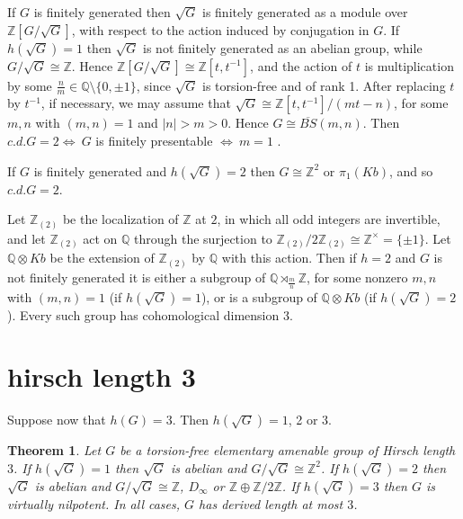 \documentclass[12pt]{amsart}
\newtheorem{theorem}{Theorem}
\begin{document}
If $G$ is finitely generated then $\sqrt{G}$ is finitely generated as a module over
$\mathbb{Z}[G/\sqrt{G}]$, with respect to the action induced by conjugation in $G$.
If $h(\sqrt{G})=1$ then $\sqrt{G}$ is not finitely generated as an abelian group, 
while $G/\sqrt{G}\cong\mathbb{Z}$.
Hence  $\mathbb{Z}[G/\sqrt{G}]\cong\mathbb{Z}[t,t^{-1}]$,
and the action of $t$ is multiplication by some 
$\frac{n}m\in\mathbb{Q}\setminus\{0,\pm1\}$,
since $\sqrt{G}$ is torsion-free and of rank 1.
After replacing $t$ by $t^{-1}$, if necessary, 
we may assume that $\sqrt{G}\cong\mathbb{Z}[t,t^{-1}]/(mt-n)$, 
for some $m,n$ with $(m,n)=1$ and $|n|>m>0$.
Hence $G\cong\overline{BS}(m,n)$.
Then $c.d.G=2\Leftrightarrow~G$ is finitely presentable 
$\Leftrightarrow~{m}=1$ \cite{Gi79}.

If $G$ is finitely generated and $h(\sqrt{G})=2$ then $G\cong\mathbb{Z}^2$ or
$\pi_1(Kb)$, and so $c.d.G=2$.

Let $\mathbb{Z}_{(2)}$ be the localization of $\mathbb{Z}$ at $2$, 
in which all odd integers are invertible, and let $\mathbb{Z}_{(2)}$ act 
on $\mathbb{Q}$ through the surjection to 
$\mathbb{Z}_{(2)}/2\mathbb{Z}_{(2)}\cong\mathbb{Z}^\times=\{\pm1\}$.
Let  $\mathbb{Q}\otimes{Kb}$ be the extension of $\mathbb{Z}_{(2)}$ by 
$\mathbb{Q}$ with this action.
Then if $h=2$ and $G$ is not finitely generated it is either a subgroup of 
$\mathbb{Q}\rtimes_{\frac{m}n}\mathbb{Z}$,
for some nonzero $m,n$ with $(m,n)=1$  (if $h(\sqrt{G})=1$),
or is a subgroup of 
$\mathbb{Q}\otimes{Kb}$ (if $h(\sqrt{G})=2$).
Every such group has cohomological dimension 3.

\section{hirsch length 3}

Suppose now that $h(G)=3$. Then $h(\sqrt{G})=1$,  2 or 3.

\begin{theorem}
\label{h=3}
Let $G$ be a torsion-free elementary amenable group of Hirsch length $3$.
If $h(\sqrt{G})=1$ then $\sqrt{G}$ is abelian and $G/\sqrt{G}\cong\mathbb{Z}^2$.
If $h(\sqrt{G})=2$ then $\sqrt{G}$ is abelian and $G/\sqrt{G}\cong\mathbb{Z}$, 
$D_\infty$ or $\mathbb{Z}\oplus\mathbb{Z}/2\mathbb{Z}$.
If $h(\sqrt{G})=3$ then $G$ is virtually nilpotent.
In all cases, $G$ has derived length at most $3$.
\end{theorem}
\end{document}

